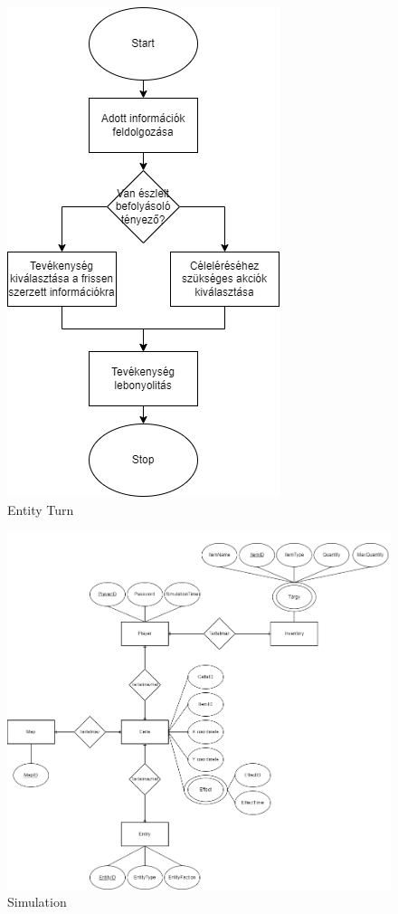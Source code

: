 \begin{figure}[!ht]
	\centering
	\includegraphics[scale=1]{images/entityturnUML.png}
	\caption{Entity Turn}
	\label{fig:entityturn}
\end{figure}

\begin{figure}[!ht]
	\centering
	\includegraphics[scale=0.4]{images/simulationER.png}
	\caption{Simulation}
	\label{fig:simulation}
\end{figure}